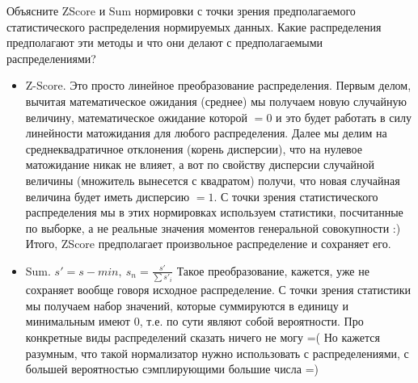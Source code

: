 \begin{task}[5]
Объясните ZScore и Sum нормировки с точки зрения предполагаемого статистического распределения нормируемых данных. Какие распределения предполагают эти методы и что они делают с предполагаемыми распределениями?
\end{task}
\begin{solution}
\begin{itemize}
	\item Z-Score. Это просто линейное преобразование распределения. Первым делом, вычитая математическое ожидания (среднее) мы получаем новую случайную величину, математическое ожидание которой $= 0$ и это будет работать в силу линейности матожидания для любого распределения. Далее мы делим на среднеквадратичное отклонения (корень дисперсии), что на нулевое матожидание никак не влияет, а вот по свойству дисперсии случайной величины (множитель вынесется с квадратом) получи, что новая случайная величина будет иметь дисперсию $=1$. С точки зрения статистического распределения мы в этих нормировках используем статистики, посчитанные по выборке, а не реальные значения моментов генеральной совокупности :) Итого, ZScore предполагает произвольное распределение и сохраняет его.
	\item Sum. $s' = s - min,\ s_n = \frac{s'}{\sum{s'_i}}$ Такое преобразование, кажется, уже не сохраняет вообще говоря исходное распределение. С точки зрения статистики мы получаем набор значений, которые суммируются в единицу и минимальным имеют 0, т.е. по сути являют собой вероятности. Про конкретные виды распределений сказать ничего не могу =( Но кажется разумным, что такой нормализатор нужно использовать с распределениями, с большей вероятностью сэмплирующими большие числа =)
\end{itemize}
\end{solution}

